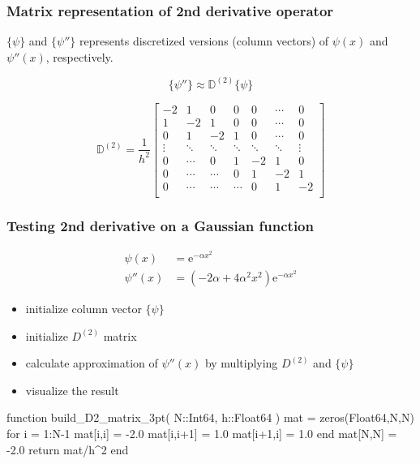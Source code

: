 \begin{frame}
\frametitle{Matrix representation of 2nd derivative operator}

$\{ \psi \}$ and $\{ \psi'' \}$ represents discretized versions (column vectors)
of $\psi(x)$ and $\psi''(x)$, respectively.

\begin{equation*}
\{ \psi'' \} \approx \mathbb{D}^{(2)} \{ \psi \}
\end{equation*}

\begin{equation*}
\mathbb{D}^{(2)} = \frac{1}{h^2}
\begin{bmatrix}
-2  &  1  &  0  &  0  & 0 & \cdots & 0 \\
 1  & -2  &  1  &  0  & 0 & \cdots & 0 \\
 0  &  1  & -2  &  1  & 0 & \cdots & 0 \\
 \vdots  &  \ddots  &  \ddots  & \ddots  & \ddots  & \ddots & \vdots \\
 0 & \cdots & 0 & 1 & -2 & 1 & 0 \\
 0  &  \cdots  & \cdots & 0  & 1  & -2  & 1 \\
 0  &  \cdots  & \cdots & \cdots & 0  &  1  & -2 \\
\end{bmatrix}
\end{equation*}

\end{frame}


\begin{frame}
\frametitle{Testing 2nd derivative on a Gaussian function}

\begin{align*}
\psi(x) &= \mathrm{e}^{-\alpha x^2} \\
\psi''(x) &= \left( -2 \alpha + 4\alpha^2 x^2 \right) \mathrm{e}^{-\alpha x^2}
\end{align*}

\begin{itemize}
\item initialize column vector $\{ \psi \}$
\item initialize $D^{(2)}$ matrix
\item calculate approximation of $\psi''(x)$ by multiplying $D^{(2)}$ and $\{ \psi \}$
\item visualize the result
\end{itemize}

\end{frame}


\begin{frame}[fragile]

\begin{juliacode}
function build_D2_matrix_3pt( N::Int64, h::Float64 )
    mat = zeros(Float64,N,N)
    for i = 1:N-1
        mat[i,i] = -2.0
        mat[i,i+1] = 1.0
        mat[i+1,i] = 1.0
    end
    mat[N,N] = -2.0
    return mat/h^2
end
\end{juliacode}

\end{frame}


